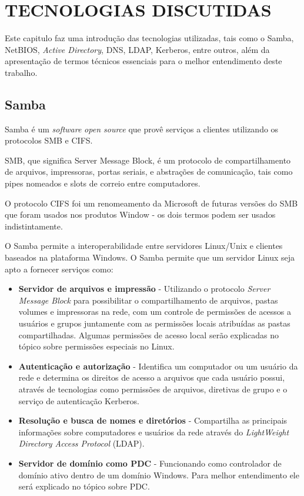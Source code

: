 \chapter{TECNOLOGIAS DISCUTIDAS}

Este capitulo faz uma introdução das tecnologias utilizadas, tais como o Samba, NetBIOS, \textit{Active Directory}, DNS, LDAP, Kerberos, entre outros, além da apresentação de termos técnicos essenciais para o melhor entendimento deste trabalho.

\section{Samba}

Samba é um \textit{software} \textit{open source} que provê serviços a clientes utilizando os protocolos SMB e CIFS.

SMB, que significa Server Message Block, é um protocolo de compartilhamento de arquivos, impressoras, portas seriais, e abstrações de comunicação, tais como pipes nomeados e slots de correio entre computadores.\cite{SMB}

O protocolo CIFS foi um renomeamento da Microsoft de futuras versões do SMB que foram usados nos produtos Window - os dois termos podem ser usados indistintamente. \cite{SAMBA}

O Samba permite a interoperabilidade entre servidores Linux/Unix e clientes baseados na
plataforma Windows.
O Samba permite que um servidor Linux seja apto a fornecer serviços como:
  \begin{itemize}
    \item \textbf{Servidor de arquivos e impressão} - Utilizando o protocolo \textit{Server Message Block} para possibilitar o compartilhamento de arquivos, pastas volumes e impressoras na rede, com um controle de permissões de acessos a usuários e grupos juntamente com as permissões locais atribuídas as pastas compartilhadas. Algumas permissões de acesso local serão explicadas no tópico sobre permissões especiais no Linux.

    \item \textbf{Autenticação e autorização} - Identifica um computador ou um usuário da rede e determina os direitos de acesso a arquivos que cada usuário possui, através de tecnologias como permissões de arquivos, diretivas de grupo e o serviço de autenticação Kerberos.

    \item \textbf{Resolução e busca de nomes e diretórios} - Compartilha as principais informações sobre computadores e usuários da rede através do \textit{LightWeight Directory Access Protocol} (LDAP).

    \item \textbf{Servidor de domínio como PDC} - Funcionando como controlador de domínio ativo dentro de um domínio Windows. Para melhor entendimento ele será explicado no tópico sobre PDC.
  \end{itemize}

